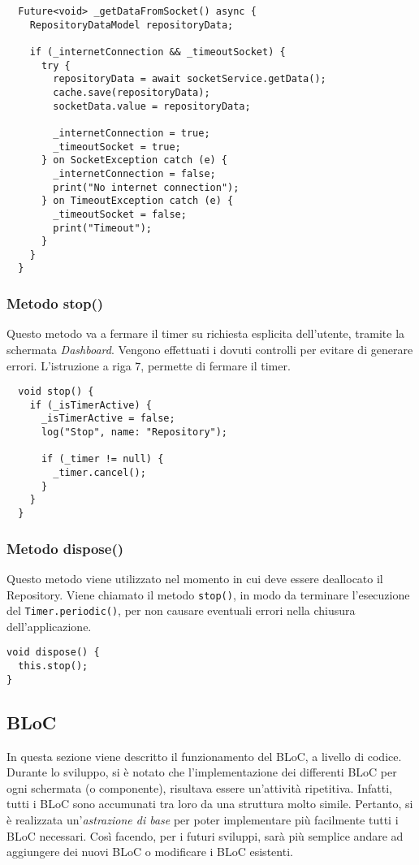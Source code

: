   \begin{lstlisting}
  Future<void> _getDataFromSocket() async {
    RepositoryDataModel repositoryData;

    if (_internetConnection && _timeoutSocket) {
      try {
        repositoryData = await socketService.getData();
        cache.save(repositoryData);
        socketData.value = repositoryData;

        _internetConnection = true;
        _timeoutSocket = true;
      } on SocketException catch (e) {
        _internetConnection = false;
        print("No internet connection");
      } on TimeoutException catch (e) {
        _timeoutSocket = false;
        print("Timeout");
      }
    }
  }
  \end{lstlisting}

\subsubsection{Metodo stop()}
Questo metodo va a fermare il timer su richiesta esplicita dell'utente, tramite la schermata \textit{Dashboard}. Vengono effettuati i dovuti controlli per evitare di generare errori. L'istruzione a riga 7, permette di fermare il timer.

  \begin{lstlisting}
  void stop() {
    if (_isTimerActive) {
      _isTimerActive = false;
      log("Stop", name: "Repository");

      if (_timer != null) {
        _timer.cancel();
      }
    }
  }
  \end{lstlisting}

\subsubsection{Metodo dispose()}
Questo metodo viene utilizzato nel momento in cui deve essere deallocato il Repository. Viene chiamato il metodo \verb|stop()|, in modo da terminare l'esecuzione del \verb|Timer.periodic()|, per non causare eventuali errori nella chiusura dell'applicazione.

\begin{lstlisting}
void dispose() {
  this.stop();
}
\end{lstlisting}

\subsection{BLoC}
In questa sezione viene descritto il funzionamento del BLoC, a livello di codice. Durante lo sviluppo, si è notato che l'implementazione dei differenti BLoC per ogni schermata (o componente), risultava essere un'attività ripetitiva. Infatti, tutti i BLoC sono accumunati tra loro da una struttura molto simile. Pertanto, si è realizzata un'\textit{astrazione di base} per poter implementare più facilmente tutti i BLoC necessari. Così facendo, per i futuri sviluppi, sarà più semplice andare ad aggiungere dei nuovi BLoC o modificare i BLoC esistenti.


